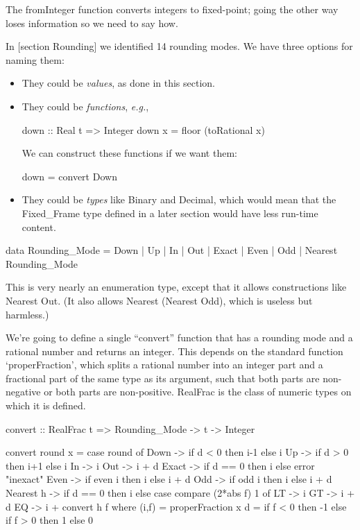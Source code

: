 \documentclass{article}
\begin{document}
The fromInteger function converts integers to fixed-point;
going the other way loses information so we need to say how.

In [section Rounding] we identified 14 rounding modes.
We have three options for naming them:
\begin{itemize}
\item They could be {\it values}, as done in this section.
\item They could be {\it functions}, {\it e.g.},
\begin{code}%
down :: Real t => Integer
down x = floor (toRational x)
\end{code}
We can construct these functions if we want them:
\begin{code}%
down = convert Down
\end{code}
\item They could be {\it types} like Binary and Decimal,
which would mean that the Fixed\_Frame type defined in a
later section would have less run-time content.
\end{itemize}

\begin{code}
data Rounding_Mode
   = Down
   | Up
   | In
   | Out
   | Exact
   | Even
   | Odd
   | Nearest Rounding_Mode
\end{code}

This is very nearly an enumeration type, except that it
allows constructions like Nearest Out.  (It also allows
Nearest (Nearest Odd), which is useless but harmless.)

We're going to define a single ``convert'' function that has
a rounding mode and a rational number and returns an integer.
This depends on the standard function `properFraction',
which splits a rational number into an integer part and
a fractional part of the same type as its argument, such
that both parts are non-negative or both parts are non-positive.
RealFrac is the class of numeric types on which it is defined.

\begin{code}
convert :: RealFrac t => Rounding_Mode -> t -> Integer

convert round x =
  case round of
    Down      -> if d < 0 then i-1 else i
    Up        -> if d > 0 then i+1 else i
    In        -> i
    Out       -> i + d
    Exact     -> if d == 0 then i else error "inexact"
    Even      -> if even i then i else i + d
    Odd       -> if odd  i then i else i + d
    Nearest h -> if d == 0 then i else
                 case compare (2*abs f) 1 of
                   LT -> i
                   GT -> i + d
                   EQ -> i + convert h f
  where (i,f) = properFraction x
        d     = if f < 0 then -1 else if f > 0 then 1 else 0
\end{code}
\end{document}
